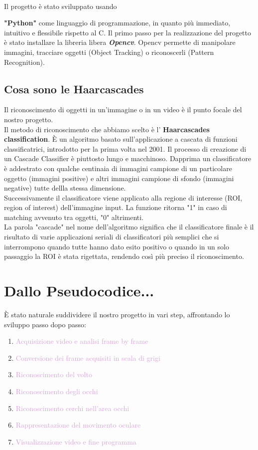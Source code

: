 \documentclass[12pt]{article}
\begin{document}
\\Il progetto \`e stato sviluppato usando {\textbf{"Python"} come linguaggio di programmazione, in quanto pi\`u immediato, intuitivo e flessibile rispetto al C. Il primo passo per la realizzazione del progetto \`e stato installare la libreria libera \textit{\textbf{Opencv}}. Opencv permette di manipolare immagini, tracciare oggetti (Object Tracking) o riconoscerli (Pattern Recognition). 
	\subsection{Cosa sono le Haarcascades}
	Il riconoscimento di oggetti in un'immagine o in un video \`e il punto focale del nostro progetto. \\
	Il metodo di riconoscimento che abbiamo scelto \`e l' \textbf{Haarcascades classification}. \`E un algoritmo basato sull'applicazione a cascata di funzioni classificatrici, introdotto per la prima volta nel 2001. 
	 Il processo di creazione di un Cascade Classifier \`e piuttosto lungo e macchinoso. Dapprima un classificatore \`e addestrato con qualche centinaia di immagini campione di un particolare oggetto (immagini positive) e altri immagini campione di sfondo (immagini negative) tutte dellla stessa dimensione. \\ Successivamente il classificatore viene applicato alla regione di interesse (ROI, region of interest) dell'immagine input. La funzione ritorna "1" in caso di matching avvenuto tra oggetti, "0" altrimenti. \\
	La parola "cascade" nel nome dell'algoritmo significa che il classificatore finale \`e il risultato di varie applicazioni seriali di classificatori pi\`u semplici che si interrompono quando tutte hanno dato esito positivo o quando in un solo passaggio la ROI \`e stata rigettata, rendendo cos\`i pi\`u preciso il riconoscimento.
\pagebreak

\section{Dallo Pseudocodice...}
\`E stato naturale suddividere il nostro progetto in vari step, affrontando lo sviluppo passo dopo passo:
\begin{enumerate}
	\item \label{primo}\textcolor{Plum}{Acquisizione video e analisi frame by frame}
	\item \label{secondo} \textcolor{Plum}{Conversione dei frame acquisiti in scala di grigi}
	\item \label{terzo} \textcolor{Plum}{Riconoscimento del volto}
	\item \label{quarto}\textcolor{Plum}{Riconoscimento degli occhi}
        \item \label{quinto}\textcolor{Plum}{Riconoscimento cerchi nell'area occhi}
    	\item \label{sesto}\textcolor{Plum}{Rappresentazione del movimento oculare}
    	\item \label{settimo}\textcolor{Plum}{Visualizzazione video e fine programma}
\end{enumerate}

}
\end{document}
